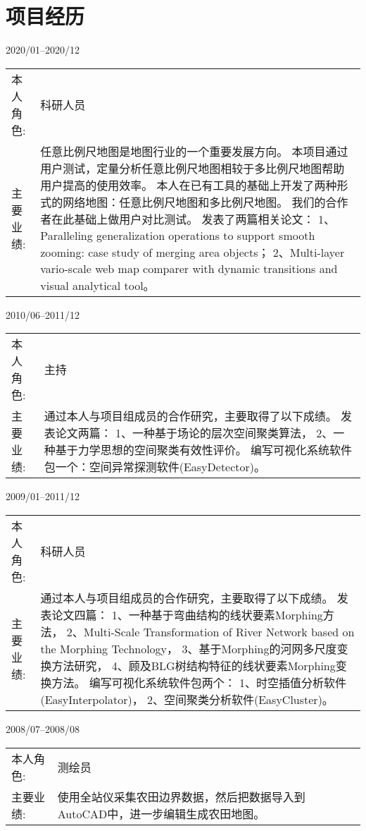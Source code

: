 \documentclass{resume}
\begin{document}
\section{项目经历}
{2020/01--2020/12}
\begin{tabular}{lp{15cm}}			
	本人角色:  & 科研人员 \\
	主要业绩:  & 任意比例尺地图是地图行业的一个重要发展方向。
                本项目通过用户测试，定量分析任意比例尺地图相较于多比例尺地图帮助用户提高的使用效率。
                本人在已有工具的基础上开发了两种形式的网络地图：任意比例尺地图和多比例尺地图。
                我们的合作者在此基础上做用户对比测试。
                发表了两篇相关论文：
                1、Paralleling generalization operations to support smooth zooming: 
                case study of merging area objects；
                2、Multi-layer vario-scale web map comparer with dynamic transitions and 
                visual analytical tool。
\end{tabular}%
%
{2010/06--2011/12}
\begin{tabular}{lp{15cm}}	
	本人角色:  & 主持 \\
	主要业绩:  & 通过本人与项目组成员的合作研究，主要取得了以下成绩。
                发表论文两篇：
                1、一种基于场论的层次空间聚类算法，
                2、一种基于力学思想的空间聚类有效性评价。
                编写可视化系统软件包一个：空间异常探测软件(EasyDetector)。
\end{tabular}
%
{2009/01--2011/12}
\begin{tabular}{lp{15cm}}	
	本人角色:  & 科研人员 \\
	主要业绩:  & 通过本人与项目组成员的合作研究，主要取得了以下成绩。
                发表论文四篇：
                1、一种基于弯曲结构的线状要素Morphing方法，
                2、Multi-Scale Transformation of River Network based on the Morphing Technology，
                3、基于Morphing的河网多尺度变换方法研究，
                4、顾及BLG树结构特征的线状要素Morphing变换方法。
                编写可视化系统软件包两个：
                1、时空插值分析软件(EasyInterpolator)，
                2、空间聚类分析软件(EasyCluster)。                
\end{tabular}
%
{2008/07--2008/08}
\begin{tabular}{lp{15cm}}	
	本人角色:  & 测绘员 \\
	主要业绩:  & 使用全站仪采集农田边界数据，然后把数据导入到AutoCAD中，进一步编辑生成农田地图。                
\end{tabular}
\end{document}

